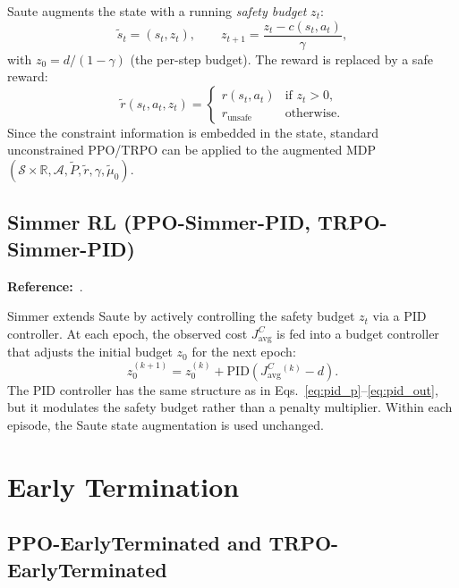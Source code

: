 \documentclass[12pt,a4paper]{article}
\theoremstyle{definition}
\newcommand{\R}{\mathbb{R}}
\begin{document}
Saute augments the state with a running \emph{safety budget} $z_t$:
\begin{equation}
  \tilde{s}_t = (s_t, z_t), \qquad z_{t+1} = \frac{z_t - c(s_t,a_t)}{\gamma},
\end{equation}
with $z_0 = d/(1-\gamma)$ (the per-step budget). The reward is replaced by a safe reward:
\begin{equation}
  \tilde{r}(s_t,a_t,z_t) =
  \begin{cases}
    r(s_t,a_t) & \text{if } z_t > 0, \\
    r_{\mathrm{unsafe}} & \text{otherwise.}
  \end{cases}
\end{equation}
Since the constraint information is embedded in the state, standard unconstrained PPO/TRPO
can be applied to the augmented MDP $(\mathcal{S}\times\R, \mathcal{A}, \tilde{P}, \tilde{r}, \gamma, \tilde{\mu}_0)$.

\subsection{Simmer RL (PPO-Simmer-PID, TRPO-Simmer-PID)}
\label{sec:simmer}

\textbf{Reference:}~\citet{sootla2022simmer}.

Simmer extends Saute by actively controlling the safety budget $z_t$ via a PID controller.
At each epoch, the observed cost $J^C_{\mathrm{avg}}$ is fed into a budget controller that
adjusts the initial budget $z_0$ for the next epoch:
\begin{equation}
  z_0^{(k+1)} = z_0^{(k)} + \mathrm{PID}(J^C_{\mathrm{avg}}^{(k)} - d).
\end{equation}
The PID controller has the same structure as in Eqs.~\ref{eq:pid_p}--\ref{eq:pid_out},
but it modulates the safety budget rather than a penalty multiplier. Within each episode,
the Saute state augmentation is used unchanged.

\section{Early Termination}
\label{sec:et}

\subsection{PPO-EarlyTerminated and TRPO-EarlyTerminated}
\label{sec:early}
\end{document}
